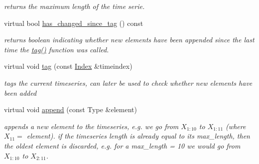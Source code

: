 \begin{DoxyCompactItemize}
\begin{DoxyCompactList}\small\item\em returns the maximum length of the time serie. \end{DoxyCompactList}\item 
\mbox{\label{classreal__time__tools_1_1ThreadsafeTimeseries_a77705f3c87496efac4ae066dc2601ba0}} 
virtual bool \hyperlink{classreal__time__tools_1_1ThreadsafeTimeseries_a77705f3c87496efac4ae066dc2601ba0}{has\+\_\+changed\+\_\+since\+\_\+tag} () const
\begin{DoxyCompactList}\small\item\em returns boolean indicating whether new elements have been appended since the last time the \hyperlink{classreal__time__tools_1_1ThreadsafeTimeseries_a07a775400d1b9446bded449ad953a8d9}{tag()} function was called. \end{DoxyCompactList}\item 
\mbox{\label{classreal__time__tools_1_1ThreadsafeTimeseries_a07a775400d1b9446bded449ad953a8d9}} 
virtual void \hyperlink{classreal__time__tools_1_1ThreadsafeTimeseries_a07a775400d1b9446bded449ad953a8d9}{tag} (const \hyperlink{classreal__time__tools_1_1ThreadsafeTimeseries_a9364696c534468d7ad927883b16ca981}{Index} \&timeindex)
\begin{DoxyCompactList}\small\item\em tags the current timeseries, can later be used to check whether new elements have been added \end{DoxyCompactList}\item 
\mbox{\label{classreal__time__tools_1_1ThreadsafeTimeseries_ae0a782bf3b1a483647d5d342a994335c}} 
virtual void \hyperlink{classreal__time__tools_1_1ThreadsafeTimeseries_ae0a782bf3b1a483647d5d342a994335c}{append} (const Type \&element)
\begin{DoxyCompactList}\small\item\em appends a new element to the timeseries, e.\+g. we go from $ X_{1:10} $ to $ X_{1:11} $ (where $ X_{11}=$ element). if the timeseries length is already equal to its max\+\_\+length, then the oldest element is discarded, e.\+g. for a max\+\_\+length = 10 we would go from $ X_{1:10} $ to $ X_{2:11} $. \end{DoxyCompactList}\end{DoxyCompactItemize}
